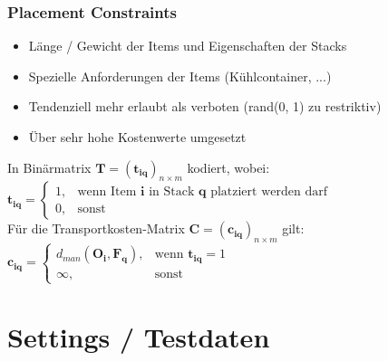 \documentclass{beamer}
\begin{document}
\begin{frame}
\frametitle{Placement Constraints}
\begin{itemize}
    \item Länge / Gewicht der Items und Eigenschaften der Stacks
    \item Spezielle Anforderungen der Items (Kühlcontainer, ...)
    \item Tendenziell mehr erlaubt als verboten (rand(0, 1) zu restriktiv)
    \item Über sehr hohe Kostenwerte umgesetzt\newline
\end{itemize}
In Binärmatrix $\boldsymbol{T} = (\boldsymbol{t_{iq}})_{n \times m}$ kodiert, wobei:
$
    \boldsymbol{t_{iq}} =
\begin{cases}
    1, & \text{wenn Item $\boldsymbol{i}$ in Stack $\boldsymbol{q}$ platziert werden darf }\\
    0, & \text{sonst}
\end{cases}
$
\\[20pt]
Für die Transportkosten-Matrix $\boldsymbol{C} = (\boldsymbol{c_{iq}})_{n \times m}$ gilt:
$
    \boldsymbol{c_{iq}} =
\begin{cases}
    d_{man}(\boldsymbol{O_i}, \boldsymbol{F_q}), & \text{wenn $\boldsymbol{t_{iq}} = 1$}\\
    \infty, & \text{sonst}
\end{cases}
$
\end{frame}

\section{Settings / Testdaten}
\end{document}
